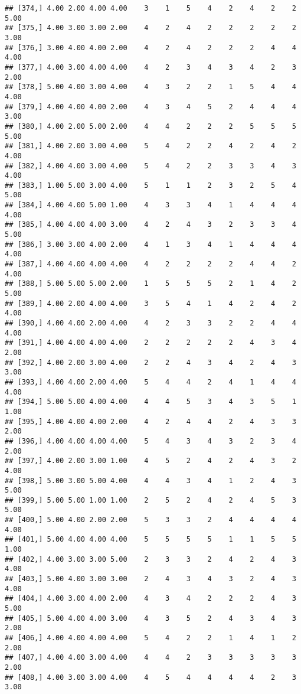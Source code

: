 \documentclass[]{article}
\begin{document}
\begin{verbatim}
## [374,] 4.00 2.00 4.00 4.00    3    1    5    4    2    4    2    2 5.00
## [375,] 4.00 3.00 3.00 2.00    4    2    4    2    2    2    2    2 3.00
## [376,] 3.00 4.00 4.00 2.00    4    2    4    2    2    2    4    4 4.00
## [377,] 4.00 3.00 4.00 4.00    4    2    3    4    3    4    2    3 2.00
## [378,] 5.00 4.00 3.00 4.00    4    3    2    2    1    5    4    4 4.00
## [379,] 4.00 4.00 4.00 2.00    4    3    4    5    2    4    4    4 3.00
## [380,] 4.00 2.00 5.00 2.00    4    4    2    2    2    5    5    5 5.00
## [381,] 4.00 2.00 3.00 4.00    5    4    2    2    4    2    4    2 4.00
## [382,] 4.00 4.00 3.00 4.00    5    4    2    2    3    3    4    3 4.00
## [383,] 1.00 5.00 3.00 4.00    5    1    1    2    3    2    5    4 5.00
## [384,] 4.00 4.00 5.00 1.00    4    3    3    4    1    4    4    4 4.00
## [385,] 4.00 4.00 4.00 3.00    4    2    4    3    2    3    3    4 5.00
## [386,] 3.00 3.00 4.00 2.00    4    1    3    4    1    4    4    4 4.00
## [387,] 4.00 4.00 4.00 4.00    4    2    2    2    2    4    4    2 4.00
## [388,] 5.00 5.00 5.00 2.00    1    5    5    5    2    1    4    2 5.00
## [389,] 4.00 2.00 4.00 4.00    3    5    4    1    4    2    4    2 4.00
## [390,] 4.00 4.00 2.00 4.00    4    2    3    3    2    2    4    4 4.00
## [391,] 4.00 4.00 4.00 4.00    2    2    2    2    2    4    3    4 2.00
## [392,] 4.00 2.00 3.00 4.00    2    2    4    3    4    2    4    3 3.00
## [393,] 4.00 4.00 2.00 4.00    5    4    4    2    4    1    4    4 4.00
## [394,] 5.00 5.00 4.00 4.00    4    4    5    3    4    3    5    1 1.00
## [395,] 4.00 4.00 4.00 2.00    4    2    4    4    2    4    3    3 2.00
## [396,] 4.00 4.00 4.00 4.00    5    4    3    4    3    2    3    4 2.00
## [397,] 4.00 2.00 3.00 1.00    4    5    2    4    2    4    3    2 4.00
## [398,] 5.00 3.00 5.00 4.00    4    4    3    4    1    2    4    3 5.00
## [399,] 5.00 5.00 1.00 1.00    2    5    2    4    2    4    5    3 5.00
## [400,] 5.00 4.00 2.00 2.00    5    3    3    2    4    4    4    4 4.00
## [401,] 5.00 4.00 4.00 4.00    5    5    5    5    1    1    5    5 1.00
## [402,] 4.00 3.00 3.00 5.00    2    3    3    2    4    2    4    3 4.00
## [403,] 5.00 4.00 3.00 3.00    2    4    3    4    3    2    4    3 4.00
## [404,] 4.00 3.00 4.00 2.00    4    3    4    2    2    2    4    3 5.00
## [405,] 5.00 4.00 4.00 3.00    4    3    5    2    4    3    4    3 2.00
## [406,] 4.00 4.00 4.00 4.00    5    4    2    2    1    4    1    2 2.00
## [407,] 4.00 4.00 3.00 4.00    4    4    2    3    3    3    3    3 2.00
## [408,] 4.00 3.00 3.00 4.00    4    5    4    4    4    4    2    3 3.00

\end{verbatim}
\end{document}
